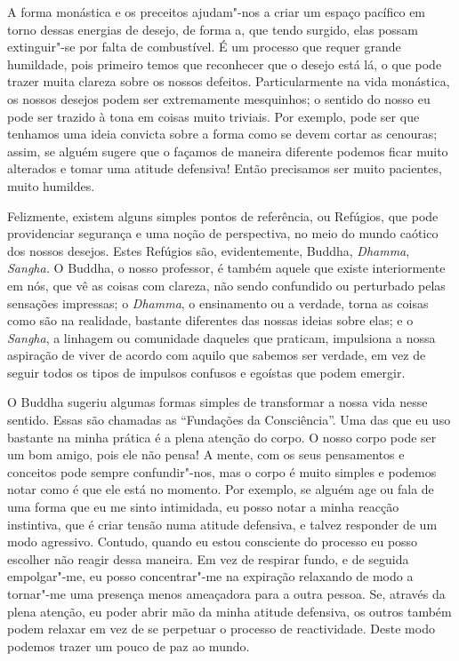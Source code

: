 A forma monástica e os preceitos ajudam"-nos a criar um espaço pacífico
em torno dessas energias de desejo, de forma a, que tendo surgido, elas
possam extinguir"-se por falta de combustível. É um processo que requer
grande humildade, pois primeiro temos que reconhecer que o desejo está
lá, o que pode trazer muita clareza sobre os nossos defeitos.
Particularmente na vida monástica, os nossos desejos podem ser
extremamente mesquinhos; o sentido do nosso eu pode ser trazido à tona
em coisas muito triviais. Por exemplo, pode ser que tenhamos uma ideia
convicta sobre a forma como se devem cortar as cenouras; assim, se
alguém sugere que o façamos de maneira diferente podemos ficar muito
alterados e tomar uma atitude defensiva! Então precisamos ser muito
pacientes, muito humildes.

Felizmente, existem alguns simples pontos de referência, ou Refúgios,
que pode providenciar segurança e uma noção de perspectiva, no meio do
mundo caótico dos nossos desejos. Estes Refúgios são, evidentemente,
Buddha, \emph{Dhamma}, \emph{Sangha.} O Buddha, o nosso professor, é
também aquele que existe interiormente em nós, que vê as coisas com
clareza, não sendo confundido ou perturbado pelas sensações impressas; o
\emph{Dhamma}, o ensinamento ou a verdade, torna as coisas como são na
realidade, bastante diferentes das nossas ideias sobre elas; e o
\emph{Sangha}, a linhagem ou comunidade daqueles que praticam,
impulsiona a nossa aspiração de viver de acordo com aquilo que sabemos
ser verdade, em vez de seguir todos os tipos de impulsos confusos e
egoístas que podem emergir.

O Buddha sugeriu algumas formas simples de transformar a nossa vida
nesse sentido. Essas são chamadas as ``Fundações da Consciência''. Uma
das que eu uso bastante na minha prática é a plena atenção do corpo. O
nosso corpo pode ser um bom amigo, pois ele não pensa! A mente, com os
seus pensamentos e conceitos pode sempre confundir"-nos, mas o corpo é
muito simples e podemos notar como é que ele está no momento. Por
exemplo, se alguém age ou fala de uma forma que eu me sinto intimidada,
eu posso notar a minha reacção instintiva, que é criar tensão numa
atitude defensiva, e talvez responder de um modo agressivo. Contudo,
quando eu estou consciente do processo eu posso escolher não reagir
dessa maneira. Em vez de respirar fundo, e de seguida empolgar"-me, eu
posso concentrar"-me na expiração relaxando de modo a tornar"-me uma
presença menos ameaçadora para a outra pessoa. Se, através da plena
atenção, eu poder abrir mão da minha atitude defensiva, os outros também
podem relaxar em vez de se perpetuar o processo de reactividade. Deste
modo podemos trazer um pouco de paz ao mundo.

